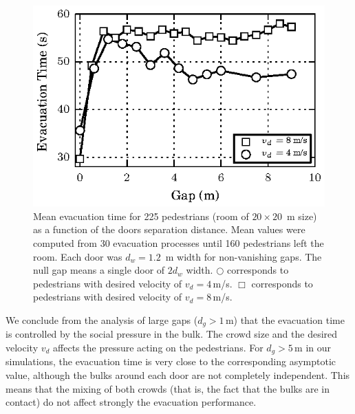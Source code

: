 \begin{figure}
\includegraphics[width=\columnwidth]{./fig14.eps}
\caption{\label{fig:12} Mean evacuation time for 225 pedestrians (room of 
$20\times20$~m size) as a function of the doors separation distance. Mean 
values were computed from 30 evacuation processes until 160 pedestrians left 
the room. Each door was $d_w=1.2$~m width for non-vanishing gaps. The null gap 
means a single door of $2d_w$ width. $\bigcirc$ corresponds to pedestrians 
with desired velocity of $v_d=4\,$m/s. $\Box$ corresponds to pedestrians 
with desired velocity of $v_d=8\,$m/s. }
\end{figure}


We conclude from the analysis of large gaps ($d_g>1\,$m) that the evacuation 
time is controlled by the social pressure in the bulk. The crowd size and 
the desired velocity $v_d$ affects the pressure acting on the pedestrians. 
For $d_g>5\,$m in our simulations, the evacuation time is very close to the 
corresponding asymptotic value, although the bulks around each door are not 
completely independent. This means that the mixing of both crowds (that is, 
the fact that the bulks are in contact) do not affect strongly the evacuation 
performance.   \\





